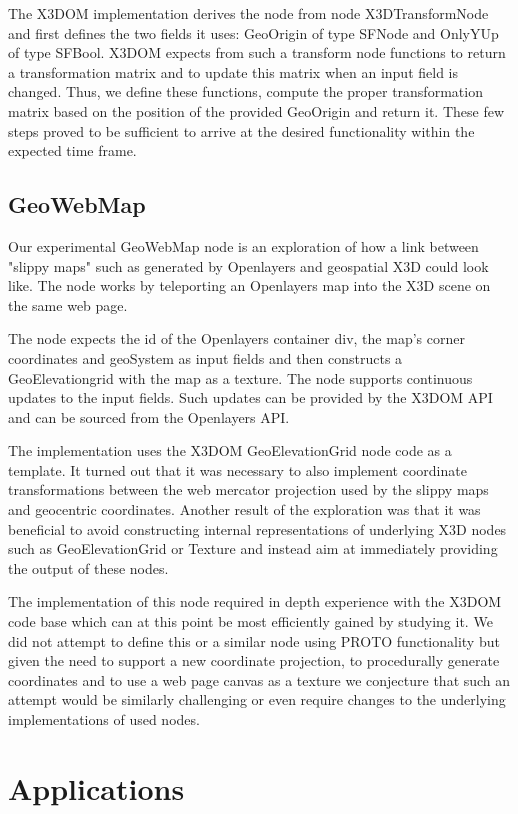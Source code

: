 \documentclass{acmsiggraph}                     %
\begin{document}
The X3DOM implementation derives the node from node X3DTransformNode and first defines the two fields it uses: GeoOrigin of type SFNode and OnlyYUp of type SFBool. X3DOM expects from such a transform node functions to return a transformation matrix and to update this matrix when an input field is changed. Thus, we define these functions, compute the proper transformation matrix based on the position of the provided GeoOrigin and return it. These few steps proved to be sufficient to arrive at the desired functionality within the expected time frame.

\subsection{GeoWebMap}

Our experimental GeoWebMap node is an exploration of how a link between "slippy maps" such as generated by Openlayers \cite{OL15} and geospatial X3D could look like. The node works by teleporting an Openlayers map into the X3D scene on the same web page.

The node expects the id of the Openlayers container div, the map's corner coordinates and geoSystem as input fields and then constructs a GeoElevationgrid with the map as a texture. The node supports continuous updates to the input fields. Such updates can be provided by the X3DOM API and can be sourced from the Openlayers API.

The implementation uses the X3DOM GeoElevationGrid node code as a template. It turned out that it was necessary to also implement coordinate transformations between the web mercator projection used by the slippy maps and geocentric coordinates. Another result of the exploration was that it was beneficial to avoid constructing internal representations of underlying X3D nodes such as GeoElevationGrid or Texture and instead aim at immediately providing the output of these nodes.

The implementation of this node required in depth experience with the X3DOM code base which can at this point be most efficiently gained by studying it. We did not attempt to define this or a similar node using PROTO functionality but given the need to support a new coordinate projection, to procedurally generate coordinates and to use a web page canvas as a texture we conjecture that such an attempt would be similarly challenging or even require changes to the underlying implementations of used nodes.  

\section{Applications}
\end{document}
